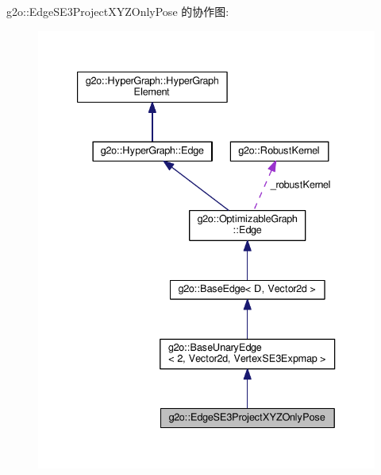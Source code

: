g2o\-:\-:Edge\-S\-E3\-Project\-X\-Y\-Z\-Only\-Pose 的协作图\-:
\nopagebreak
\begin{figure}[H]
\begin{center}
\leavevmode
\includegraphics[width=336pt]{classg2o_1_1EdgeSE3ProjectXYZOnlyPose__coll__graph}
\end{center}
\end{figure}
